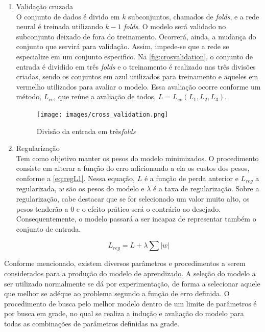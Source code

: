 \documentclass[
    12pt,
    oneside,
    a4paper,
    english,
    brazil
]{abntex2}
\begin{document}
\begin{enumerate}
    \item Validação cruzada\\
        O  conjunto  de  dados  é  divido  em  $k$  subconjuntos,  chamados  de
        \textit{folds},   e  a   rede  neural   é  treinada   utilizando  $k-1$
        \textit{folds}. O modelo  será validado no subconjunto  deixado de fora
        do treinamento. Ocorrerá, ainda, a mudança do conjunto que servirá para
        validação. Assim,  impede-se que a  rede se especialize em  um conjunto
        especifico. Na  \autoref{fig:crosvalidation}, o  conjunto de  entrada é
        dividido  em  três  \textit{folds}  e o  treinamento  é  realizado  nas
        três  divisões criadas,  sendo  os conjuntos  em  azul utilizados  para
        treinamento e  aqueles em  vermelho utilizados  para avaliar  o modelo.
        Essa  avaliação  ocorre  conforme  um método,  $L_{cv}$,  que  reúne  a
        avaliação de todos, $L = L_{cv}(L_1, L_2, L_3)$.

        \begin{figure}[ht]
            \centering
            \caption{Divisão da entrada em três\textit{folds}}\label{fig:crosvalidation}
            \texttt{[image: images/cross\_validation.png]}
        \end{figure}

    \item Regularização\\
        Tem como objetivo manter os pesos do modelo minimizados. O procedimento
        consiste em  alterar a função do  erro adicionando a ela  os custos dos
        pesos, conforme a \autoref{eq:regL1}. Nessa  equação, $L$ é a função de
        perda anterior e $L_{reg}$ a regularizada, $w$ são os pesos do modelo e
        $\lambda$  é  a taxa  de  regularização.  Sobre a  regularização,  cabe
        destacar  que  se  for  selecionado  um  valor  muito  alto,  os  pesos
        tenderão  a $0$  e  o  efeito prático  será  o  contrário ao  desejado.
        Consequentemente, o modelo passará a  ser incapaz de representar também
        o conjunto de entrada.

        \begin{equation}\label{eq:regL1}
            L_{reg} = L + \lambda \sum{|w|}
        \end{equation}
\end{enumerate}

Conforme  mencionado,  existem  diversos  parâmetros e  procedimentos  a  serem
considerados para  a produção do modelo  de aprendizado. A seleção  do modelo a
ser  utilizado normalmente  se dá  por  experimentação, de  forma a  selecionar
aquele que melhor  se adéque ao problema  segundo a função de  erro definida. O
procedimento de  busca pelo melhor modelo  dentro de um limite  de parâmetros é
por busca  em grade, no qual  se realiza a  indução e avaliação do  modelo para
todas as combinações de parâmetros definidas na grade.
\end{document}

